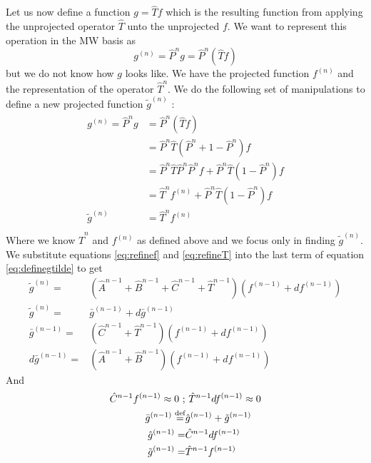 \documentclass[../master_thesis.tex]{subfiles}
\begin{document}
Let us now define a function $g = \hat{T}f$ which is the resulting function from applying the
unprojected operator $\hat{T}$ unto the unprojected $f$. We want to represent this
operation in the \ac{MW} basis as
\begin{equation}
  g^{(n)} = \hat{P}^ng =  \hat{P}^n\left(\hat{T}f\right)
\end{equation}
but we do not know how $g$ looks like. We have the projected function $f^{ (n)}$ and the
representation of the operator $\hat{T}^n$. We do the following set of manipulations to
define a new projected function $\tilde{g}^{(n)}$ \cite{Frediani:2013}:
\begin{align}
  \begin{split}\label{eq:definegtilde}
    g^{(n)} = \hat{P}^ng &=  \hat{P}^n\left(\hat{T}f\right)\\
     &= \hat{P}^n\hat{T}\left(\hat{P}^n + 1 - \hat{P}^n\right)f\\
     &= \hat{P}^n\hat{T}\hat{P}^n\hat{P}^nf + \hat{P}^n\hat{T}\left(1 - \hat{P}^n\right)f\\
     &=   \hat{T}^nf^{(n)} + \hat{P}^n\hat{T}\left(1 - \hat{P}^n\right)f\\
    \tilde{g}^{(n)} &= \hat{T}^nf^{(n)}\\
  \end{split}
\end{align}
Where we know $ \hat{T}^n$ and $f^{(n)}$ as defined above and we focus only in
finding $\tilde{g}^{(n)}$. We substitute equations \ref{eq:refinef} and \ref{eq:refineT}
into the last term of equation \ref{eq:definegtilde} to get
\begin{align}
  \tilde{g}^{(n)} =& \left(\hat{A}^{n-1} + \hat{B}^{n-1} + \hat{C}^{n-1} + \hat{T}^{n-1}\right)\left(f^{(n-1)} + df^{(n-1)}\right)\\
  \tilde{g}^{(n)} =&  \bar{g}^{(n-1)} + d\bar{g}^{(n-1)}\\
  \bar{g}^{(n-1)} =&\left(\hat{C}^{n-1} + \hat{T}^{n-1}\right)\left(f^{(n-1)} + df^{(n-1)}\right)\\
  d\bar{g}^{(n-1)} =& \left(\hat{A}^{n-1} + \hat{B}^{n-1}\right)\left(f^{(n-1)} + df^{(n-1)}\right)
\end{align}
And
\begin{align}
  \begin{split}
    \hat{C}^{n-1}f^{(n-1)} \approx 0 \ ;& \ \hat{T}^{n-1}df^{(n-1)}\approx 0\\
    \bar{g}^{(n-1)} \defeq& \hat{g}^{(n-1)} + \tilde{g}^{(n-1)}\\
    \hat{g}^{(n-1)} =& \hat{C}^{n-1}df^{(n-1)}\\
    \tilde{g}^{(n-1)} =& \hat{T}^{n-1}f^{(n-1)}
  \end{split}
\end{align}
\end{document}
